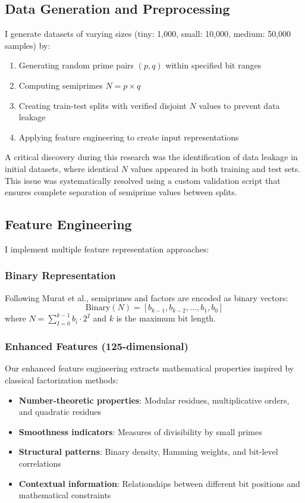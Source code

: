 \documentclass[12pt]{article}
\begin{document}
\subsection{Data Generation and Preprocessing}

I generate datasets of varying sizes (tiny: 1,000, small: 10,000, medium: 50,000 samples) by:
\begin{enumerate}
\item Generating random prime pairs $(p, q)$ within specified bit ranges
\item Computing semiprimes $N = p \times q$
\item Creating train-test splits with verified disjoint $N$ values to prevent data leakage
\item Applying feature engineering to create input representations
\end{enumerate}

A critical discovery during this research was the identification of data leakage in initial datasets, where identical $N$ values appeared in both training and test sets. This issue was systematically resolved using a custom validation script that ensures complete separation of semiprime values between splits.

\subsection{Feature Engineering}

I implement multiple feature representation approaches:

\subsubsection{Binary Representation}
Following Murat et al., semiprimes and factors are encoded as binary vectors:
$$\text{Binary}(N) = [b_{k-1}, b_{k-2}, \ldots, b_1, b_0]$$
where $N = \sum_{I=0}^{k-1} b_i \cdot 2^I$ and $k$ is the maximum bit length.

\subsubsection{Enhanced Features (125-dimensional)}
Our enhanced feature engineering extracts mathematical properties inspired by classical factorization methods:
\begin{itemize}
\item \textbf{Number-theoretic properties}: Modular residues, multiplicative orders, and quadratic residues
\item \textbf{Smoothness indicators}: Measures of divisibility by small primes
\item \textbf{Structural patterns}: Binary density, Hamming weights, and bit-level correlations
\item \textbf{Contextual information}: Relationships between different bit positions and mathematical constraints
\end{itemize}
\end{document}
